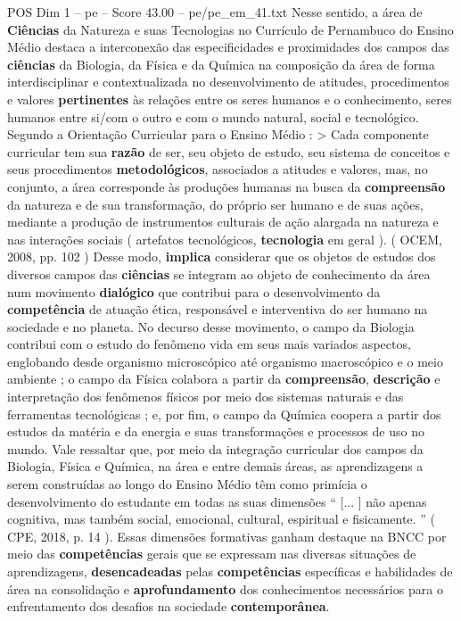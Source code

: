 \begin{textsample}{POS Dim 1 – pe – Score 43.00 – pe/pe\_em\_41.txt}
Nesse sentido, a área de \textbf{Ciências} da Natureza e suas Tecnologias no Currículo de Pernambuco do Ensino Médio destaca a interconexão das especificidades e proximidades dos campos das \textbf{ciências} da Biologia, da Física e da Química na composição da área de forma interdisciplinar e contextualizada no desenvolvimento de atitudes, procedimentos e valores \textbf{pertinentes} às relações entre os seres humanos e o conhecimento, seres humanos entre si/com o outro e com o mundo natural, social e tecnológico.
Segundo a Orientação Curricular para o Ensino Médio : > Cada componente curricular tem sua \textbf{razão} de ser, seu objeto de estudo, seu sistema de conceitos e seus procedimentos \textbf{metodológicos}, associados a atitudes e valores, mas, no conjunto, a área corresponde às produções humanas na busca da \textbf{compreensão} da natureza e de sua transformação, do próprio ser humano e de suas ações, mediante a produção de instrumentos culturais de ação alargada na natureza e nas interações sociais ( artefatos tecnológicos, \textbf{tecnologia} em geral ). ( OCEM, 2008, pp. 102 ) Desse modo, \textbf{implica} considerar que os objetos de estudos dos diversos campos das \textbf{ciências} se integram ao objeto de conhecimento da área num movimento \textbf{dialógico} que contribui para o desenvolvimento da \textbf{competência} de atuação ética, responsável e interventiva do ser humano na sociedade e no planeta.
No decurso desse movimento, o campo da Biologia contribui com o estudo do fenômeno vida em seus mais variados aspectos, englobando desde organismo microscópico até organismo macroscópico e o meio ambiente ; o campo da Física colabora a partir da \textbf{compreensão}, \textbf{descrição} e interpretação dos fenômenos físicos por meio dos sistemas naturais e das ferramentas tecnológicas ; e, por fim, o campo da Química coopera a partir dos estudos da matéria e da energia e suas transformações e processos de uso no mundo.
Vale ressaltar que, por meio da integração curricular dos campos da Biologia, Física e Química, na área e entre demais áreas, as aprendizagens a serem construídas ao longo do Ensino Médio têm como primícia o desenvolvimento do estudante em todas as suas dimensões “ [... ] não apenas cognitiva, mas também social, emocional, cultural, espiritual e fisicamente. ” ( CPE, 2018, p. 14 ).
Essas dimensões formativas ganham destaque na BNCC por meio das \textbf{competências} gerais que se expressam nas diversas situações de aprendizagens, \textbf{desencadeadas} pelas \textbf{competências} específicas e habilidades de área na consolidação e \textbf{aprofundamento} dos conhecimentos necessários para o enfrentamento dos desafios na sociedade \textbf{contemporânea}.

\end{textsample}

